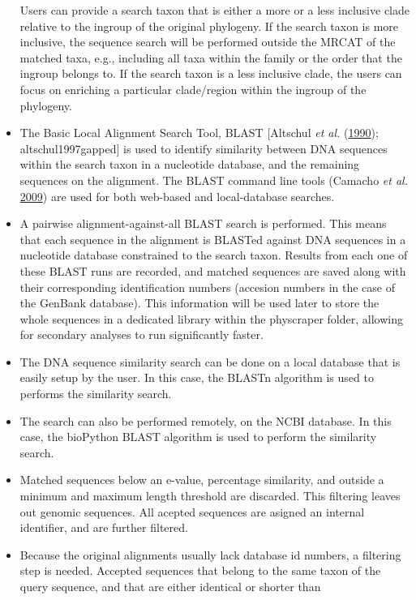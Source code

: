 \documentclass[]{article}
\begin{document}
\begin{itemize}
  Users can provide a search taxon that is either a more or a less inclusive
  clade relative to the ingroup of the original phylogeny. If the search taxon is more inclusive, the sequence search will be performed outside the MRCAT of the matched taxa, e.g., including all taxa within
  the family or the order that the ingroup belongs to. If the search taxon is a less inclusive clade, the users can focus on enriching a particular clade/region within the ingroup of the phylogeny.
\item
  The Basic Local Alignment Search Tool, BLAST {[}Altschul \emph{et al.} (\protect\hyperlink{ref-altschul1990basic}{1990}); altschul1997gapped{]} is used to identify
  similarity between DNA sequences within the search taxon in a nucleotide
  database, and the remaining sequences on the alignment.
  The BLAST command line tools (Camacho \emph{et al.} \protect\hyperlink{ref-camacho2009blast}{2009}) are used for both web-based and local-database searches.
\item
  A pairwise alignment-against-all BLAST search is performed. This means that each sequence
  in the alignment is BLASTed against DNA sequences in a nucleotide database constrained to the search
  taxon. Results from each one of these BLAST runs are recorded, and matched sequences are saved
  along with their corresponding identification numbers (accesion numbers in the case of the GenBank database). This information will be used later to store the whole sequences in a dedicated library within the physcraper folder, allowing for secondary analyses to run significantly faster.
\item
  The DNA sequence similarity search can be done on a local database that is easily
  setup by the user. In this case, the BLASTn algorithm is used to performs the similarity search.
\item
  The search can also be performed remotely, on the NCBI database. In this case, the
  bioPython BLAST algorithm is used to perform the similarity search.
\item
  Matched sequences below an e-value, percentage similarity, and outside a minimum
  and maximum length threshold are discarded. This filtering leaves out genomic sequences.
  All acepted sequences are asigned an internal identifier, and are further filtered.
\item
  Because the original alignments usually lack database id numbers, a filtering
  step is needed. Accepted sequences that belong to the
  same taxon of the query sequence, and that are either identical or shorter than

\end{itemize}
\end{document}
